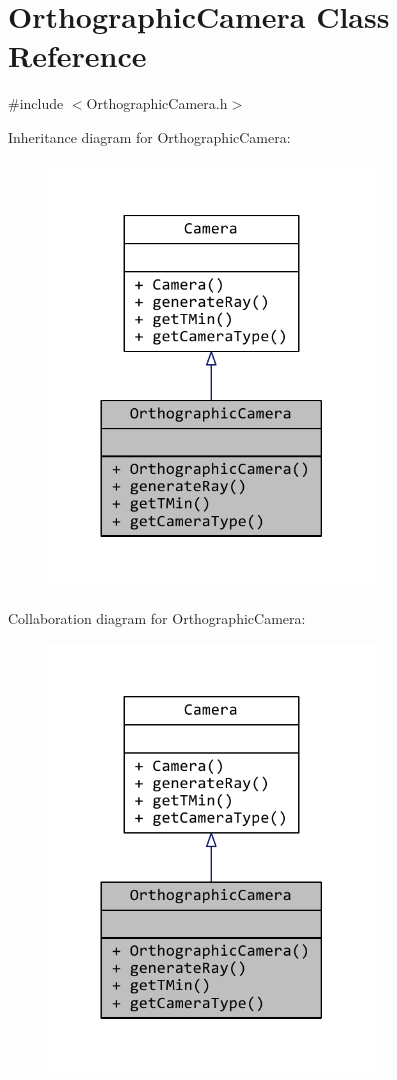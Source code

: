 \hypertarget{classOrthographicCamera}{\section{Orthographic\+Camera Class Reference}
\label{classOrthographicCamera}
}


{\ttfamily \#include $<$Orthographic\+Camera.\+h$>$}



Inheritance diagram for Orthographic\+Camera\+:
\nopagebreak
\begin{figure}[H]
\begin{center}
\leavevmode
\includegraphics[width=245pt]{classOrthographicCamera__inherit__graph}
\end{center}
\end{figure}


Collaboration diagram for Orthographic\+Camera\+:
\nopagebreak
\begin{figure}[H]
\begin{center}
\leavevmode
\includegraphics[width=245pt]{classOrthographicCamera__coll__graph}
\end{center}
\end{figure}
